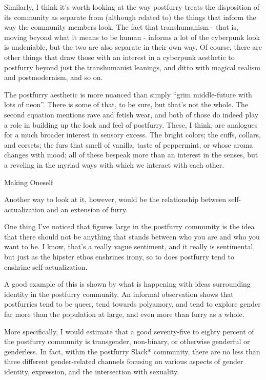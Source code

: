 Similarly, I think it's worth looking at the way postfurry treats the disposition of its community as separate from (although related to) the things that inform the way the community members look.{ }The fact that transhumanism - that is, moving beyond what it means to be human - informs a lot of the cyberpunk look is undeniable, but the two are also separate in their own way.{ Of course}, there are other things that draw those with an interest in a cyberpunk aesthetic to postfurry beyond just the transhumanist leanings, and ditto with magical realism and postmodernism, and so on.

The postfurry aesthetic is more nuanced than simply ``grim middle-future with lots of neon''. There is some of that, to be sure, but that's not the whole. The second equation mentions rave and fetish wear, and both of those do indeed play a role in building up the look and feel of postfurry. These, I think, are analogues for a much broader interest in sensory excess. The bright colors; the cuffs, collars, and corsets; the furs that smell of vanilla, taste of peppermint, or whose aroma changes with mood; all of these bespeak more than an interest in the senses, but a reveling in the myriad ways with which we interact with each other.

Making Oneself

Another way to look at it, however, would be the relationship between self-actualization and an extension of furry.

One thing I've noticed that figures large in the postfurry community is the idea that there should not be anything that stands between who you are and who you want to be.{ }I know, that's a really vague sentiment, and it really is sentimental, but just as the hipster ethos enshrines irony, so to does postfurry tend to enshrine self-actualization.

A good example of this is shown by what is happening with ideas surrounding identity in the postfurry community.{ }An informal observation shows that postfurries tend to be queer, tend towards polyamory, and tend to explore gender far more than the population at large, and even more than furry as a whole.

More specifically, I would estimate that a good seventy-five to eighty percent of the postfurry community is transgender, non-binary, or otherwise genderful or genderless.{ }In fact, within the postfurry Slack* community, there are no less than three different gender-related channels focusing on various aspects of gender identity, expression, and the intersection with sexuality.

